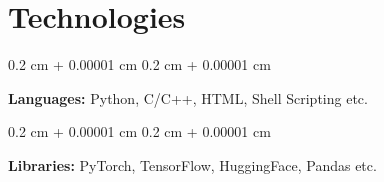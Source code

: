 \documentclass[12pt, letterpaper]{article}
\newenvironment{onecolentry}{
    \begin{adjustwidth}{
        0.2 cm + 0.00001 cm
    }{
        0.2 cm + 0.00001 cm
    }
}{
    \end{adjustwidth}
} %
\begin{document}
    \section{Technologies}



        
        \begin{onecolentry}
            \textbf{Languages:} Python, C/C++, HTML, Shell Scripting etc.
        \end{onecolentry}

        \vspace{0.2 cm}

        \begin{onecolentry}
            \textbf{Libraries:} PyTorch, TensorFlow, HuggingFace, Pandas etc.
        \end{onecolentry}


    
\end{document}
